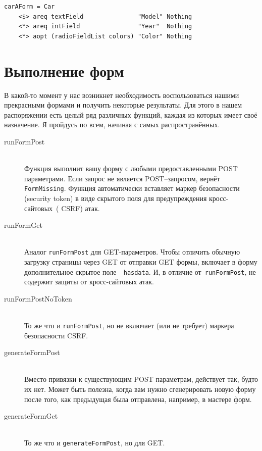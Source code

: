 \begin{lstlisting}
carAForm = Car
    <$> areq textField               "Model" Nothing
    <*> areq intField                "Year"  Nothing
    <*> aopt (radioFieldList colors) "Color" Nothing
\end{lstlisting}%

\section{Выполнение форм}
В какой-то момент у нас возникнет необходимость воспользоваться нашими
прекрасными формами и получить некоторые результаты.  Для этого в нашем
распоряжении есть целый ряд различных функций, каждая из которых имеет своё
назначение. Я пройдусь по всем, начиная с самых распространённых.

\begin{description}
    \item[runFormPost] \hfill \\
        Функция выполнит вашу форму с любыми предоставленными POST параметрами.
        Если запрос не является POST--запросом, вернёт \lstinline'FormMissing'.
        Функция автоматически вставляет маркер безопасности (security token) в
        виде скрытого поля для предупреждения
        кросс-сайтовых~(%
        {CSRF}) атак.

    \item[runFormGet] \hfill \\
        Аналог \lstinline'runFormPost' для GET-параметров. Чтобы отличить
        обычную загрузку страницы через GET от отправки GET формы, включает в
        форму дополнительное скрытое поле~\lstinline'_hasdata'. И, в отличие
        от~\lstinline'runFormPost', не содержит защиты от кросс-сайтовых атак.

    \item[runFormPostNoToken] \hfill \\
        То же что и \lstinline'runFormPost', но не включает (или не требует)
        маркера безопасности CSRF.

    \item[generateFormPost] \hfill \\
        Вместо привязки к существующим POST параметрам, действует так, будто
        их нет. Может быть полезна, когда вам нужно сгенерировать новую форму
        после того, как предыдущая была отправлена, например, в мастере форм.

    \item[generateFormGet] \hfill \\
        То же что и \lstinline'generateFormPost', но для GET.
\end{description}

